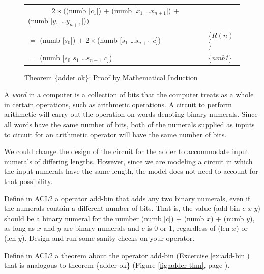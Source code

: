 \begin{figure}
\begin{center}
\begin{tabular}{ll}
 ~~~~~~ $2\times($\textsf{(numb [$c_1$])} $+$ \textsf{(numb [$x_1$ \dots $x_{n+1}$])} $+$ \textsf{(numb [$y_1$ \dots $y_{n+1}$])}$)$ & \\
$=$ \textsf{(numb [$s_0$])} $+$ $2\times$\textsf{(numb [$s_1$ \dots $s_{n+1}$ $c$])}                                        & \{$R(n)$\} \\
$=$ \textsf{(numb [$s_0$ $s_1$ \dots $s_{n+1}$ $c$])}                                                              & \{\emph{nmb1}\} \\
\end{tabular}
\end{center}
\caption{Theorem \{adder ok\}: Proof by Mathematical Induction}
\label{fig:adder-thm-prf}
\end{figure}

\begin{aside}
A \emph{word} in a computer is a collection of bits
that the computer treats as a whole in certain operations,
such as arithmetic operations.
A circuit to perform arithmetic will carry out
the operation on words denoting binary numerals.
Since all words have the same number of bits,
both of the numerals supplied as inputs to circuit
for an arithmetic operator will have the same number of bits.

We could change the design of the circuit for the adder
to accommodate input numerals of differing lengths.
However, since we are modeling a circuit
in which the input numerals have the same length,
the model does not need to account for that possibility.
\caption{Adder Circuit and Numerals of Different Lengths}
\label{adder-circuit-and-numerals-of-different-lengths}
\end{aside}

\begin{ExerciseList}
\Exercise \label{ex:add-bin}
Define in ACL2 a operator \textsf{add-bin}
that adds any two binary numerals,
even if the numerals contain a different number of bits.
That is, the value \textsf{(add-bin $c$ $x$ $y$)} should be a binary numeral
for the number \textsf{(numb [$c$])} $+$ \textsf{(numb $x$)} $+$ \textsf{(numb $y$)},
as long as $x$ and $y$ are binary numerals and $c$ is 0 or 1,
regardless of \textsf{(len $x$)} or \textsf{(len $y$)}.
Design and run some sanity checks on your operator.

\Exercise Define in ACL2 a theorem about the operator \textsf{add-bin} (Excercise \ref{ex:add-bin})
that is analogous to theorem \{adder-ok\}
(Figure \ref{fig:adder-thm}, page \pageref{fig:adder-thm}).

\end{ExerciseList}

